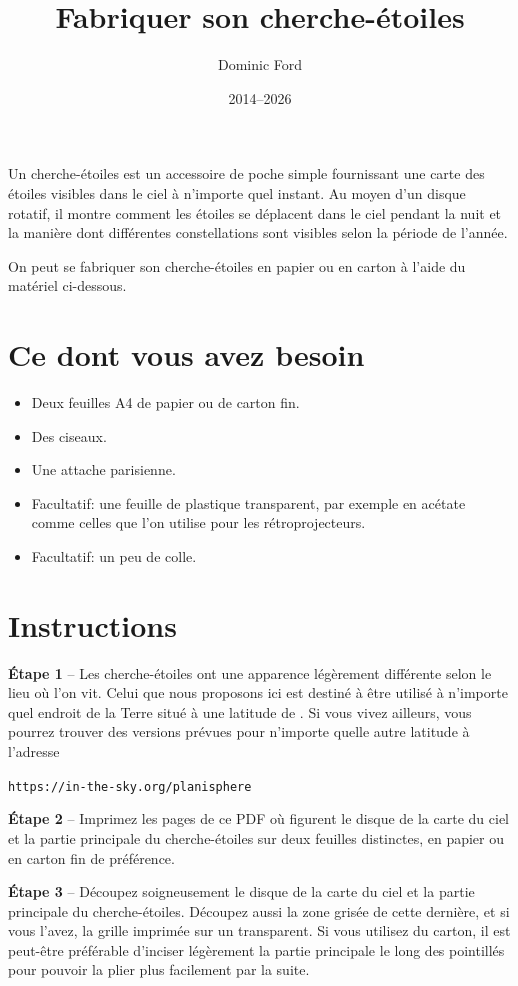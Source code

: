 \documentclass[a4paper,onecolumn,10pt]{article}
\title{Fabriquer son cherche-étoiles}
\author{Dominic Ford}
\date{2014--2026}
\begin{document}
\maketitle
\setcounter{footnote}{1}

Un cherche-étoiles est un accessoire de poche simple fournissant une carte des étoiles visibles dans le ciel à n’importe quel instant. Au moyen d’un disque rotatif, il montre comment les étoiles se déplacent dans le ciel pendant la nuit et la manière dont différentes constellations sont visibles selon la période de l’année.

On peut se fabriquer son cherche-étoiles en papier ou en carton à l’aide du matériel ci-dessous.

\section*{Ce dont vous avez besoin}

\begin{itemize}
\item Deux feuilles A4 de papier ou de carton fin.
\item Des ciseaux.
\item Une attache parisienne.
\item Facultatif: une feuille de plastique transparent, par exemple en acétate comme celles que l’on utilise pour les rétroprojecteurs.
\item Facultatif: un peu de colle.
\end{itemize}

\section*{Instructions}

{\bf Étape 1} -- Les cherche-étoiles ont une apparence légèrement différente selon le lieu où l’on vit. Celui que nous proposons ici est destiné à être utilisé à n’importe quel endroit de la Terre situé à une latitude de . Si vous vivez ailleurs, vous pourrez trouver des versions prévues pour n’importe quelle autre latitude à l’adresse

\centerline{\tt https://in-the-sky.org/planisphere}

{\bf Étape 2} -- Imprimez les pages de ce PDF où figurent le disque de la carte du ciel et la partie principale du cherche-étoiles sur deux feuilles distinctes, en papier ou en carton fin de préférence.

{\bf Étape 3} -- Découpez soigneusement le disque de la carte du ciel et la partie principale du cherche-étoiles. Découpez aussi la zone grisée de cette dernière, et si vous l’avez, la grille imprimée sur un transparent. Si vous utilisez du carton, il est peut-être préférable d’inciser légèrement la partie principale le long des pointillés pour pouvoir la plier plus facilement par la suite.
\end{document}
